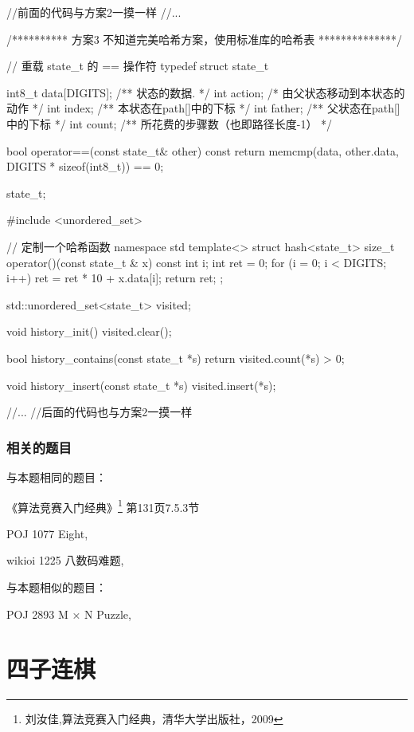 \begin{Codex}[label=eight_digits_bfs3.cpp]
//前面的代码与方案2一摸一样
//...

/********** 方案3 不知道完美哈希方案，使用标准库的哈希表 **************/

// 重载 state_t 的 == 操作符
typedef struct state_t {
    int8_t data[DIGITS];  /** 状态的数据. */
    int action; /* 由父状态移动到本状态的动作 */
    int index;  /** 本状态在path[]中的下标 */
    int father; /** 父状态在path[]中的下标 */
    int count;  /** 所花费的步骤数（也即路径长度-1） */

    bool operator==(const state_t& other) const {
        return memcmp(data, other.data, DIGITS * sizeof(int8_t)) == 0;
    }
} state_t;

#include <unordered_set>

// 定制一个哈希函数
namespace std {
template<> struct hash<state_t> {
    size_t operator()(const state_t & x) const {
        int i;
        int ret = 0;
        for (i = 0; i < DIGITS; i++)
            ret = ret * 10 + x.data[i];
        return ret;
    }
};
}

std::unordered_set<state_t> visited;

void history_init() {
    visited.clear();
}

bool history_contains(const state_t *s) {
    return visited.count(*s) > 0;
}

void history_insert(const state_t *s) {
    visited.insert(*s);
}

//...
//后面的代码也与方案2一摸一样
\end{Codex}

\subsubsection{相关的题目}
与本题相同的题目：
\begindot
\item 《算法竞赛入门经典》\footnote{刘汝佳,算法竞赛入门经典，清华大学出版社，2009} 第131页7.5.3节
\item  POJ 1077 Eight, 
\item  wikioi 1225 八数码难题, 
\myenddot

与本题相似的题目：
\begindot
\item  POJ 2893 M × N Puzzle, 
\myenddot


\section{四子连棋} %


